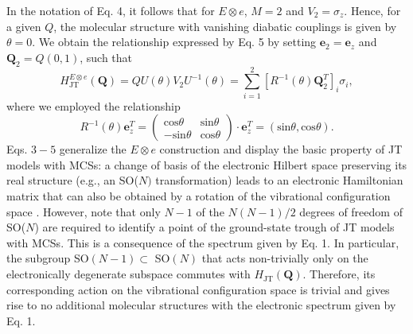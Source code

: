 \documentclass[superscriptaddress,showpacs,amsmath,amssymb,pra,twocolumn]{revtex4-1}
\begin{document}
\normalsize
In the notation of Eq. 4, it follows that for $E \otimes e$,  $M = 2$ and $V_2 = \sigma_z$. Hence, for a given $Q$, the molecular structure with vanishing diabatic couplings is given by $\theta = 0$. We obtain the relationship expressed by Eq. 5 by setting $\mathbf{e}_2 = \mathbf{e}_z$ and $\mathbf{Q}_2 = Q(0,1)$, such that
\begin{equation} H_{\text{JT}}^{E\otimes e} (\mathbf{Q}) = Q U(\theta) V_2 U^{-1}(\theta) =  \sum_{i=1}^2 \left[R^{-1}(\theta)\mathbf{Q}_2^T \right]_i \sigma_i, \end{equation}
where we employed the relationship
\begin{equation} R^{-1}(\theta) \mathbf{e}_z^T =  \begin{pmatrix}
\text{cos}\theta & \text{sin}\theta \\
-\text{sin}\theta & \text{cos}\theta \end{pmatrix}\cdot \mathbf{e}_z^T  = \left( \text{sin}\theta, \text{cos}\theta \right).\end{equation}
Eqs. $3-5$ generalize the $E \otimes e$ construction and display the basic property of JT models with MCSs: a
change of basis of the electronic Hilbert space preserving its real
structure (e.g., an SO($N)$ transformation) leads to an electronic
Hamiltonian matrix that can also be obtained by a rotation of the
vibrational configuration space \cite{pooler_continuous_1978, pooler_continuous_1980,judd_group_1982,ribeiro_continuous_2017}.
However, note that only $N-1$ of the $N(N-1)/2$ degrees of freedom
of SO($N$) are required to identify a point of the ground-state trough
of JT models with MCSs. This is a consequence of the spectrum given
by Eq. 1. In particular, the subgroup SO$(N-1)\subset$ SO$(N)$ that
acts non-trivially only on the electronically degenerate subspace
commutes with $H_{\text{JT}}(\mathbf{Q})$. Therefore, its corresponding
action on the vibrational configuration space is trivial and gives
rise to no additional molecular structures with the electronic spectrum
given by Eq. 1.
\end{document}
